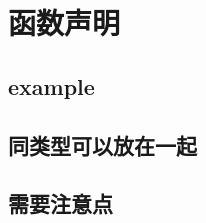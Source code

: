 \hypertarget{ux51fdux6570ux58f0ux660e}{%
\section{函数声明}\label{ux51fdux6570ux58f0ux660e}}

\begin{Shaded}
\begin{Highlighting}[]
\NormalTok{\}}
\end{Highlighting}
\end{Shaded}

\hypertarget{example}{%
\subsection{example}\label{example}}

\begin{Shaded}
\begin{Highlighting}[]
\NormalTok{) }\NormalTok{ \{}
\NormalTok{\}}
\end{Highlighting}
\end{Shaded}

\hypertarget{ux540cux7c7bux578bux53efux4ee5ux653eux5728ux4e00ux8d77}{%
\subsection{同类型可以放在一起}\label{ux540cux7c7bux578bux53efux4ee5ux653eux5728ux4e00ux8d77}}

\begin{Shaded}
\begin{Highlighting}[]
\NormalTok{) \{}\NormalTok{\}}
\NormalTok{)\{}\NormalTok{\}}
\end{Highlighting}
\end{Shaded}

\hypertarget{ux9700ux8981ux6ce8ux610fux70b9}{%
\subsection{需要注意点}\label{ux9700ux8981ux6ce8ux610fux70b9}}

